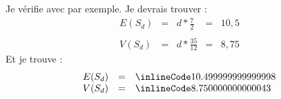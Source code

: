 Je vérifie avec  par exemple.
Je devrais trouver :
\[
  \begin{array}{rclcl}
    E(S_d) & = & d * \frac{7}{2}   & = & 10,5 \\\\
    V(S_d) & = & d * \frac{35}{12} & = & 8,75
  \end{array}
\]
Et je trouve : 
\[
  \begin{array}{rclcl}
    E(S_d) & = & \il{10.499999999999998}\\
    V(S_d) & = & \il{8.750000000000043}
  \end{array}
\]

